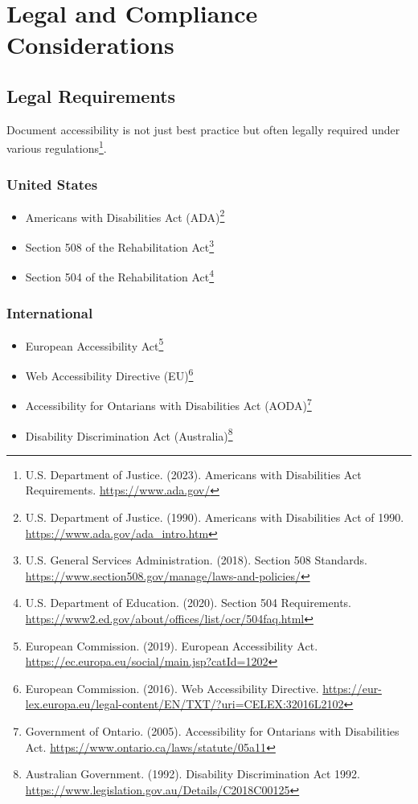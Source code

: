 \section{Legal and Compliance Considerations}
\label{sec:legal-compliance}

\subsection{Legal Requirements}
Document accessibility is not just best practice but often legally required under various regulations\footnote{U.S. Department of Justice. (2023). Americans with Disabilities Act Requirements. \url{https://www.ada.gov/}}.

\subsubsection{United States}
\begin{itemize}
\item Americans with Disabilities Act (ADA)\footnote{U.S. Department of Justice. (1990). Americans with Disabilities Act of 1990. \url{https://www.ada.gov/ada_intro.htm}}
\item Section 508 of the Rehabilitation Act\footnote{U.S. General Services Administration. (2018). Section 508 Standards. \url{https://www.section508.gov/manage/laws-and-policies/}}
\item Section 504 of the Rehabilitation Act\footnote{U.S. Department of Education. (2020). Section 504 Requirements. \url{https://www2.ed.gov/about/offices/list/ocr/504faq.html}}
\end{itemize}

\subsubsection{International}
\begin{itemize}
\item European Accessibility Act\footnote{European Commission. (2019). European Accessibility Act. \url{https://ec.europa.eu/social/main.jsp?catId=1202}}
\item Web Accessibility Directive (EU)\footnote{European Commission. (2016). Web Accessibility Directive. \url{https://eur-lex.europa.eu/legal-content/EN/TXT/?uri=CELEX:32016L2102}}
\item Accessibility for Ontarians with Disabilities Act (AODA)\footnote{Government of Ontario. (2005). Accessibility for Ontarians with Disabilities Act. \url{https://www.ontario.ca/laws/statute/05a11}}
\item Disability Discrimination Act (Australia)\footnote{Australian Government. (1992). Disability Discrimination Act 1992. \url{https://www.legislation.gov.au/Details/C2018C00125}}
\end{itemize}

